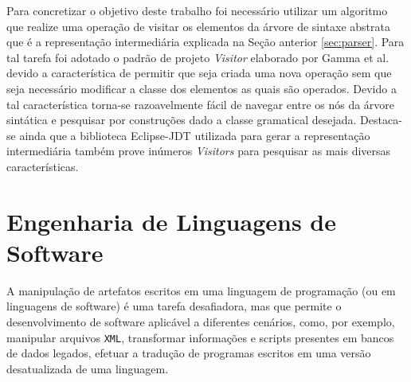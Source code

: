 Para concretizar o objetivo deste trabalho foi necessário utilizar um algoritmo que realize uma operação de visitar os elementos da árvore de sintaxe abstrata que é a representação intermediária explicada na Seção anterior \ref{sec:parser}. Para tal tarefa foi adotado o padrão de projeto \textit{Visitor} elaborado por Gamma et al.~\cite{Gamma:1995} devido a característica de permitir que seja criada uma nova operação sem que seja necessário modificar a classe dos elementos as quais são operados. Devido a tal característica torna-se razoavelmente fácil de navegar entre os nós da árvore sintática e pesquisar por construções dado a classe gramatical desejada. Destaca-se ainda que a biblioteca Eclipse-JDT utilizada para gerar a representação intermediária também prove inúmeros \textit{Visitors} para pesquisar as mais diversas características.

 



\section{Engenharia de Linguagens de Software}\label{sec:softEng}



A manipulaç\~{a}o de artefatos escritos em 
uma linguagem de programaç\~{a}o (ou em linguagens de software) 
\'{e} uma tarefa desafiadora, mas que permite o desenvolvimento 
de software aplic\'{a}vel a diferentes cen\'{a}rios, como, por exemplo, 
manipular arquivos \texttt{XML}, transformar 
informa\c c\~{o}es e scripts presentes 
em bancos de dados legados, efetuar a tradu\c c\~{a}o de programas 
escritos em uma vers\~{a}o desatualizada de uma linguagem. 

